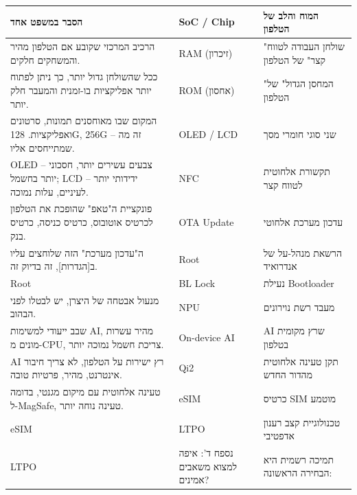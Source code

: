 
\begin{center}
\begin{tabularx}{\linewidth}{|X|X|X|}
\hline
\textbf{הסבר במשפט אחד} & \textbf{SoC / Chip} & \textbf{המוח והלב של הטלפון} \tabularnewline
\hline
הרכיב המרכזי שקובע אם הטלפון מהיר והמשחקים חלקים. & RAM (זיכרון) & "שולחן העבודה לטווח קצר" של הטלפון \tabularnewline
ככל שהשולחן גדול יותר, כך ניתן לפתוח יותר אפליקציות בו-זמנית והמעבר חלק יותר. & ROM (אחסון) & "המחסן הגדול" של הטלפון \tabularnewline
המקום שבו מאוחסנים תמונות, סרטונים ואפליקציות. 128G, 256G – זה מה שמתייחסים אליו. & OLED / LCD & שני סוגי חומרי מסך \tabularnewline
OLED – צבעים עשירים יותר, חסכוני יותר בחשמל; LCD – ידידותי יותר לעיניים, עלות נמוכה. & NFC & תקשורת אלחוטית לטווח קצר \tabularnewline
פונקציית ה"טאפ" שהופכת את הטלפון לכרטיס אוטובוס, כרטיס כניסה, כרטיס בנק. & OTA Update & עדכון מערכת אלחוטי \tabularnewline
ה"עדכון מערכת" הזה שלוחצים עליו ב[הגדרות], זה בדיוק זה. & Root & הרשאת מנהל-על של אנדרואיד \tabularnewline
Root & BL Lock & נעילת Bootloader \tabularnewline
מנעול אבטחה של היצרן, יש לבטלו לפני הבהוב. & NPU & מעבד רשת נוירונים \tabularnewline
שבב ייעודי למשימות AI, מהיר עשרות מונים מ-CPU, צריכת חשמל נמוכה יותר. & On-device AI & AI שרץ מקומית בטלפון \tabularnewline
AI רץ ישירות על הטלפון, לא צריך חיבור אינטרנט, מהיר, פרטיות טובה. & Qi2 & תקן טעינה אלחוטית מהדור החדש \tabularnewline
טעינה אלחוטית עם מיקום מגנטי, בדומה ל-MagSafe, טעינה נוחה יותר. & eSIM & כרטיס SIM מוטמע \tabularnewline
eSIM & LTPO & טכנולוגיית קצב רענון אדפטיבי \tabularnewline
LTPO & נספח ד': איפה למצוא משאבים אמינים? & תמיכה רשמית היא הבחירה הראשונה: \tabularnewline
\hline
\end{tabularx}
\end{center}
